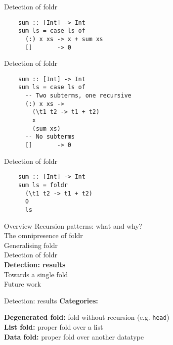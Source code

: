 \documentclass[20pt]{beamer}
\newcommand{\vspaced}{
    \vspace{5mm}
}
\begin{document}
\begin{frame}[fragile]{Detection of foldr}
    \begin{lstlisting}
    sum :: [Int] -> Int
    sum ls = case ls of
      (:) x xs -> x + sum xs
      []       -> 0
    \end{lstlisting}
\end{frame}

\begin{frame}[fragile]{Detection of foldr}
    \begin{lstlisting}
    sum :: [Int] -> Int
    sum ls = case ls of
      -- Two subterms, one recursive
      (:) x xs ->
        (\t1 t2 -> t1 + t2)
        x
        (sum xs)
      -- No subterms
      []       -> 0
    \end{lstlisting}
\end{frame}

\begin{frame}[fragile]{Detection of foldr}
    \begin{lstlisting}
    sum :: [Int] -> Int
    sum ls = foldr
      (\t1 t2 -> t1 + t2)
      0
      ls
    \end{lstlisting}
\end{frame}


\begin{frame}{Overview}
    Recursion patterns: what and why? \\
    The omnipresence of foldr \\
    Generalising foldr \\
    Detection of foldr \\
    \textbf{Detection: results} \\
    Towards a single fold \\
    Future work \\
\end{frame}

\begin{frame}{Detection: results}
    \textbf{Categories:} \\
    \vspaced
    \textbf{Degenerated fold:} fold without recursion (e.g. \texttt{head}) \\
    \textbf{List fold:} proper fold over a list \\
    \textbf{Data fold:} proper fold over another datatype \\
\end{frame}
\end{document}
